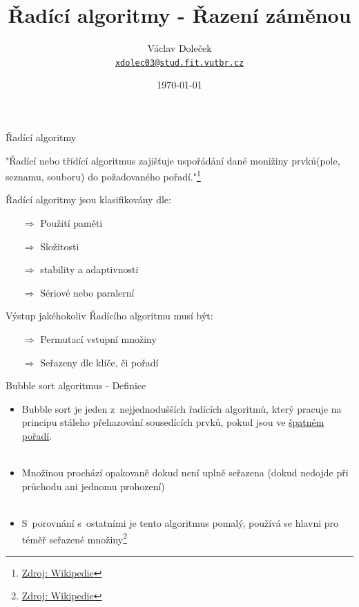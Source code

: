 \documentclass[11pt]{beamer}
\title{Řadící algoritmy - Řazení záměnou}
\author[Václav Doleček]{Václav Doleček\\
{\small \href{xdolec03@stud.fit.vutbr.cz}{\texttt{xdolec03@stud.fit.vutbr.cz}}}}
\institute[VUT]{Vysoké učení technické \\ Fakulta informačných technológií}
\date{\today}
\begin{document}
 
\frame{\titlepage}

 
\begin{frame}[fragile]{Řadící algoritmy}
\begin{center}
    "Řadící nebo třídící algoritmus zajišťuje uspořádání dané monižiny prvků(pole, seznamu, souboru) do požadovaného pořadí."\footnote{\tiny\href{https://en.wikipedia.org/wiki/Sorting_algorithm}{Zdroj: Wikipedie}}
\end{center}

Řadící algoritmy jsou klasifikovány dle:
\begin{itemize}
    \item[\(\Rightarrow\)] Použití paměti
    \item[\(\Rightarrow\)] Složitosti
    \item[\(\Rightarrow\)] stability a adaptivnosti
    \item[\(\Rightarrow\)] Sériové nebo paralerní
\end{itemize}
Výstup jakéhokoliv Řadícího algoritmu musí být:
\begin{itemize}
    \item[\(\Rightarrow\)] Permutací vstupní množiny
    \item[\(\Rightarrow\)] Seřazeny dle klíče, či pořadí
\end{itemize}

\end{frame}




\begin{frame}[fragile]{Bubble sort algoritmus - Definice}
\begin{itemize}
    \item Bubble sort je jeden z~nejjednodušších řadících algoritmů, který pracuje na principu stáleho přehazování sousedících prvků, pokud jsou ve \underline{špatném pořadí}.
    \\
    \
    \item Množinou prochází opakovaně dokud není uplně seřazena (dokud nedojde při průchodu ani jednomu prohození)
    \\
    \
    \item S~porovnání s~ostatními je tento algoritmus pomalý, používá se hlavni pro téměř seřazené množiny\footnote{\tiny\href{https://en.wikipedia.org/wiki/Bubble_sort}{Zdroj: Wikipedie}}
\end{itemize}

    
\end{frame}
 
\end{document}
